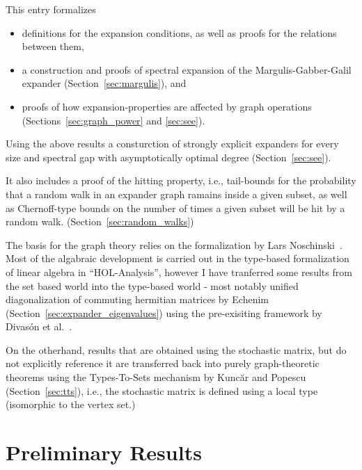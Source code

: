 \documentclass[11pt,a4paper]{article}
\begin{document}
This entry formalizes 
\begin{itemize}
\item definitions for the expansion conditions, as well as proofs for the relations between them,
\item a construction and proofs of spectral expansion of the Margulis-Gabber-Galil expander 
  (Section~\ref{sec:margulis}), and
\item proofs of how expansion-properties are affected by graph operations
(Sections~\ref{sec:graph_power} and \ref{sec:see}).
\end{itemize}
Using the above results a consturction of strongly explicit expanders for every size and 
spectral gap with asymptotically optimal degree (Section~\ref{sec:see}). 

It also includes a proof of the hitting property, i.e., tail-bounds for the probability that a 
random walk in an expander graph ramains inside a given subset, as well as Chernoff-type bounds on 
the number of times a given subset will be hit by a random walk. (Section~\ref{sec:random_walks})

The basis for the graph theory relies on the formalization by 
Lars Noschinski~\cite{Graph_Theory-AFP}. Most of the algabraic development is carried out in the
type-based formalization of linear algebra in ``HOL-Analysis'', however I have tranferred some 
results from the set based world into the type-based world - most notably unified diagonalization of 
commuting hermitian matrices by Echenim~\cite{Commuting_Hermitian-AFP} 
(Section~\ref{sec:expander_eigenvalues}) using the pre-exisiting framework by 
Divas\'{o}n et al.~\cite{Perron_Frobenius-AFP}.

On the otherhand, results that are obtained using the stochastic matrix, but do not explicitly 
reference it are transferred back into purely graph-theoretic theorems using the Types-To-Sets 
mechanism by Kunc\u{a}r and Popescu~\cite{kuncar2016} (Section~\ref{sec:tts}), i.e., the stochastic
matrix is defined using a local type (isomorphic to the vertex set.)


\section{Preliminary Results}




\end{document}
